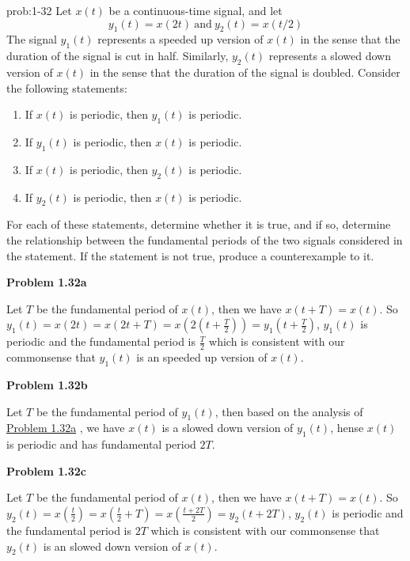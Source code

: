 \documentclass[koma,a4paper,utopia,12pt,listings-color,microtype,paralist,colorlinks,urlcolor=red]{org-article}
\begin{document}
\begin{prob}[]{prob:1-32}
Let \(x(t)\) be a continuous-time signal, and let
\begin{equation*}
y_{1}(t) = x(2t) \ \mathrm{and} \ y_{2}(t) = x(t/2)
\end{equation*}
The signal \(y_{1}(t)\) represents a speeded up version of \(x(t)\) in the
sense that the duration of the signal is cut in half. Similarly,
\(y_{2}(t)\) represents a slowed down version of \(x(t)\) in the sense that
the duration of the signal is doubled. Consider the following statements:

\begin{enumerate}
\item If \(x(t)\) is periodic, then \(y_{1}(t)\) is periodic.
\item If \(y_{1}(t)\) is periodic, then \(x(t)\) is periodic.
\item If \(x(t)\) is periodic, then \(y_{2}(t)\) is periodic.
\item If \(y_{2}(t)\) is periodic, then \(x(t)\) is periodic.
\end{enumerate}

For each of these statements, determine whether it is true, and if so,
determine the relationship between the fundamental periods of the two
signals considered in the statement. If the statement is not true, produce a
counterexample to it.
\label{prob:1-32}
\end{prob}

\textbf{Problem 1.32a} \label{Problem 1.32a}

Let \(T\) be the fundamental period of \(x(t)\), then we have \(x(t+T) = x(t)\).
So \(y_{1}(t) = x(2t) = x(2t + T) = x(2(t+ \frac{T}{2} ))=
y_{1}(t+\frac{T}{2})\), \(y_{1}(t)\) is periodic and the fundamental period is
\(\frac{T}{2}\) which is consistent with our commonsense that \(y_{1}(t)\) is an
speeded up version of \(x(t)\).

\textbf{Problem 1.32b}

Let \(T\) be the fundamental period of \(y_{1}(t)\), then based on the analysis
of \hyperref[Problem 1.32a]{Problem 1.32a} , we have \(x(t)\) is a slowed down version of \(y_{1}(t)\),
hense \(x(t)\) is periodic and has fundamental period \(2T\).

\textbf{Problem 1.32c} \label{Problem 1.32c}

Let \(T\) be the fundamental period of \(x(t)\), then we have \(x(t+T) = x(t)\).
So \(y_{2}(t) = x(\tfrac{t}{2}) = x(\tfrac{t}{2} + T) = x(\frac{t+ 2T}{2})=
y_{2}(t+2T)\), \(y_{2}(t)\) is periodic and the fundamental period is
\(2T\) which is consistent with our commonsense that \(y_{2}(t)\) is an
slowed down version of \(x(t)\).
\end{document}
